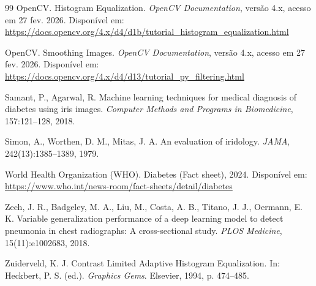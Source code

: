 \documentclass[12pt,a4paper]{article}
\begin{document}
\begin{thebibliography}{99}
OpenCV.
\newblock Histogram Equalization.
\newblock \emph{OpenCV Documentation}, versão 4.x, acesso em 27 fev. 2026.
\newblock Disponível em: \url{https://docs.opencv.org/4.x/d4/d1b/tutorial_histogram_equalization.html}

OpenCV.
\newblock Smoothing Images.
\newblock \emph{OpenCV Documentation}, versão 4.x, acesso em 27 fev. 2026.
\newblock Disponível em: \url{https://docs.opencv.org/4.x/d4/d13/tutorial_py_filtering.html}

Samant, P., Agarwal, R.
\newblock Machine learning techniques for medical diagnosis of diabetes using iris images.
\newblock \emph{Computer Methods and Programs in Biomedicine}, 157:121--128, 2018.

Simon, A., Worthen, D. M., Mitas, J. A.
\newblock An evaluation of iridology.
\newblock \emph{JAMA}, 242(13):1385--1389, 1979.

World Health Organization (WHO).
\newblock Diabetes (Fact sheet), 2024.
\newblock Disponível em: \url{https://www.who.int/news-room/fact-sheets/detail/diabetes}

Zech, J. R., Badgeley, M. A., Liu, M., Costa, A. B., Titano, J. J., Oermann, E. K.
\newblock Variable generalization performance of a deep learning model to detect pneumonia in chest radiographs: A cross-sectional study.
\newblock \emph{PLOS Medicine}, 15(11):e1002683, 2018.

Zuiderveld, K. J.
\newblock Contrast Limited Adaptive Histogram Equalization.
\newblock In: Heckbert, P. S. (ed.).
\newblock \emph{Graphics Gems}.
\newblock Elsevier, 1994, p. 474--485.

\end{thebibliography}
\end{document}
